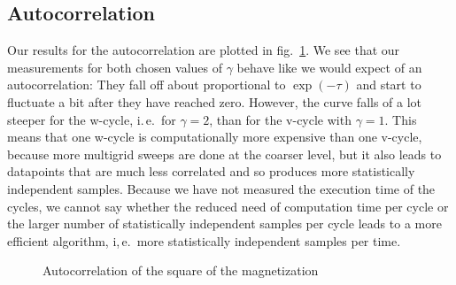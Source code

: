 \documentclass{scrartcl}
\begin{document}
\subsection{Autocorrelation}

Our results for the autocorrelation are plotted in fig.~\ref{fig:autocorrelation}. We see that our measurements for both chosen values of $\gamma$ behave like we would expect of an autocorrelation: They fall off about proportional to $\exp(-\tau)$ and start to fluctuate a bit after they have reached zero. However, the curve falls of a lot steeper for the w-cycle, i.\,e.\, for $\gamma=2$, than for the v-cycle with $\gamma=1$. This means that one w-cycle is computationally more expensive than one v-cycle, because more multigrid sweeps are done at the coarser level, but it also leads to datapoints that are much less correlated and so produces more statistically independent samples. Because we have not measured the execution time of the cycles, we cannot say whether the reduced need of computation time per cycle or the larger number of statistically independent samples per cycle leads to a more efficient algorithm, i,\,e.\, more statistically independent samples per time.
 
\begin{figure}[htbp]
	
	\caption{Autocorrelation of the square of the magnetization}
	\label{fig:autocorrelation}
\end{figure}

%

\newpage	
\listoffigures
\listoftables
\printbibliography
\end{document}
